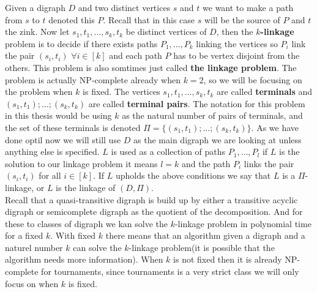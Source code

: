 Given a digraph $D$ and two distinct vertices $s$ and $t$ we want to make a path from $s$ to $t$ denoted this $P$. 
Recall that in this case $s$ will be the source of $P$ and $t$ the zink.
Now let $s_1,t_1,\dots ,s_k,t_k$ be distinct vertices of $D$, then the \textbf{$k$-linkage} problem is to decide if there exists paths $P_1,\dots ,P_k$ linking the vertices so $P_i$ link the pair $(s_i,t_i)$ $\forall i\in [k]$ and each path $P$ has to be vertex disjoint from the others. This problem is also somtimes just called \textbf{the linkage problem}.
The problem is actually NP-complete already when $k=2$, so we will be focusing on the problem when $k$ is fixed.
The vertices $s_1,t_1,\dots , s_k,t_k$ are called \textbf{terminals} and $(s_1,t_1);\dots ;(s_k,t_k)$ are called \textbf{terminal pairs}.
The notation for this problem in this thesis would be using $k$ as the natural number of pairs of terminals, and the set of these terminals is denoted $\Pi=\lbrace (s_1,t_1);\dots ;(s_k,t_k)\rbrace$. 
As we have done optil now we will still use $D$ as the main digraph we are looking at unless anything else is specified. 
$L$ is used as a collection of paths $P_1,\dots , P_l$ if $L$ is the solution to our linkage problem it means $l=k$ and the path $P_i$ links the pair $(s_i,t_i)$ for all $i\in [k]$.
If $L$ upholds the above conditions we say that $L$ is a $\Pi$-linkage, or $L$ is the linkage of $(D,\Pi)$.\\
Recall that a quasi-transitive digraph is build up by either a transitive acyclic digraph or semicomplete digraph as the quotient of the decomposition. 
And for these to classes of digraph we kan solve the $k$-linkage problem in polynomial time for a fixed $k$. With fixed $k$ there means that an algorithm given a digraph and a naturel number $k$ can solve the $k$-linkage problem(it is possible that the algorithm needs more information). When $k$ is not fixed then it is already NP-complete for tournaments, since tournaments is a very strict class we will only focus on when $k$ is fixed.
